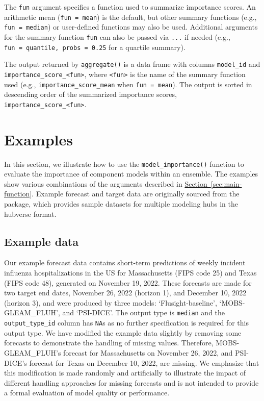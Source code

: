 \documentclass[
  article,
  shortnames,
  notitle]{jss}
\begin{document}
The \texttt{fun} argument specifies a function used to summarize
importance scores. An arithmetic mean (\texttt{fun\ =\ mean}) is the
default, but other summary functions (e.g., \texttt{fun\ =\ median}) or
user-defined functions may also be used. Additional arguments for the
summary function \texttt{fun} can also be passed via \texttt{...} if
needed (e.g., \texttt{fun\ =\ quantile,\ probs\ =\ 0.25} for a quartile
summary).

The output returned by \texttt{aggregate()} is a data frame with columns
\texttt{model\_id} and
\texttt{importance\_score\_\textless{}fun\textgreater{}}, where
\texttt{\textless{}fun\textgreater{}} is the name of the summary
function used (e.g., \texttt{importance\_score\_mean} when
\texttt{fun\ =\ mean}). The output is sorted in descending order of the
summarized importance scores,
\texttt{importance\_score\_\textless{}fun\textgreater{}}.

\section{Examples}\label{sec:examples}

In this section, we illustrate how to use the
\texttt{model\_importance()} function to evaluate the importance of
component models within an ensemble. The examples show various
combinations of the arguments described in
\hyperref[sec:main-function]{Section~\ref{sec:main-function}}. Example
forecast and target data are originally sourced from the
 package, which provides sample datasets for multiple
modeling hubs in the hubverse format.

\subsection{Example data}\label{sec:example-data}

Our example forecast data contains short-term predictions of weekly
incident influenza hospitalizations in the US for Massachusetts (FIPS
code 25) and Texas (FIPS code 48), generated on November 19, 2022. These
forecasts are made for two target end dates, November 26, 2022 (horizon
1), and December 10, 2022 (horizon 3), and were produced by three
models: `Flusight-baseline', `MOBS-GLEAM\_FLUH', and `PSI-DICE'. The
output type is \texttt{median} and the \texttt{output\_type\_id} column
has \texttt{NA}s as no further specification is required for this output
type. We have modified the example data slightly by removing some
forecasts to demonstrate the handling of missing values. Therefore,
MOBS-GLEAM\_FLUH's forecast for Massachusetts on November 26, 2022, and
PSI-DICE's forecast for Texas on December 10, 2022, are missing. We
emphasize that this modification is made randomly and artificially to
illustrate the impact of different handling approaches for missing
forecasts and is not intended to provide a formal evaluation of model
quality or performance.
\end{document}
